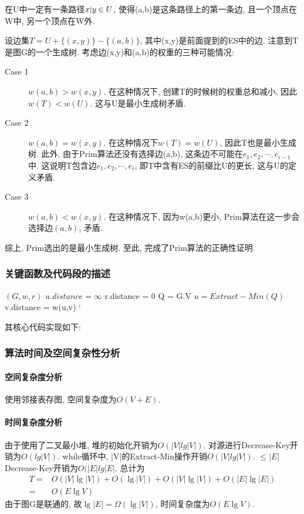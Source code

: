 在U中一定有一条路径$x\arrowvert y\in U$, 使得(a,b)是这条路径上的第一条边,
且一个顶点在W中, 另一个顶点在W外.

设边集$T=U+\{(x,y)\}-\{(a,b)\}$, 其中(x,y)是前面提到的ES中的边.
注意到T是图G的一个生成树. 考虑边(x,y)和(a,b)的权重的三种可能情况:
\begin{description}
	\item[Case 1]  $w(a,b) > w(x,y)$. 在这种情况下, 创建T的时候树的权重总和减小,
		因此$w(T) < w(U)$. 这与U是最小生成树矛盾.
	\item[Case 2] $w(a,b) = w(x,y)$. 在这种情况下$w(T)=w(U)$, 因此T也是最小生成树.
		此外, 由于Prim算法还没有选择边(a,b), 这条边不可能在$e_1,e_2,\cdots,
			e_{i-1}$中. 这说明T包含边$e_1,e_2,\cdots,e_i$, 即T中含有ES的前缀比U的更长,
		这与U的定义矛盾.
	\item[Case 3] $w(a,b)<w(x,y)$. 在这种情况下, 因为w(a,b)更小,
		Prim算法在这一步会选择边$(a,b)$, 矛盾.
\end{description}
综上, Prim选出的是最小生成树. 至此, 完成了Prim算法的正确性证明.

\subsubsection{关键函数及代码段的描述}
\begin{algorithm}
	\begin{algorithmic}{1}
		\Require $(G, w, r)$
		\State $u.distance = \infty$
		\EndFor
		\State r.distance = 0
		\State Q = G.V
		\State $u = Extract-Min(Q)$
		\State v.distance = w(u,v)
		\EndIf`
		\EndFor
		\EndWhile
	\end{algorithmic}
\end{algorithm}
其核心代码实现如下:


\subsubsection{算法时间及空间复杂性分析}
\paragraph{空间复杂度分析}
使用邻接表存图, 空间复杂度为$O(V+E)$.

\paragraph{时间复杂度分析}
由于使用了二叉最小堆, 堆的初始化开销为$O(|V|lg|V|)$.
对源进行Decrease-Key开销为$O(lg|V|)$. while循环中,
|V|的Extract-Min操作开销$O(|V|lg|V|)$. $\leq |E|$
Decrease-Key开销为$O(|E|lg|E|$. 总计为
\begin{align}
	T = & O(|V|\lg |V|) + O(\lg |V|) + O(|V|\lg |V|) + O(|E|\lg |E|)  \nonumber \\
	=   & O(E \lg V) \nonumber
\end{align}
由于图G是联通的, 故$\lg |E| = \Omega (\lg |V|)$, 时间复杂度为$O(E\lg V)$.
